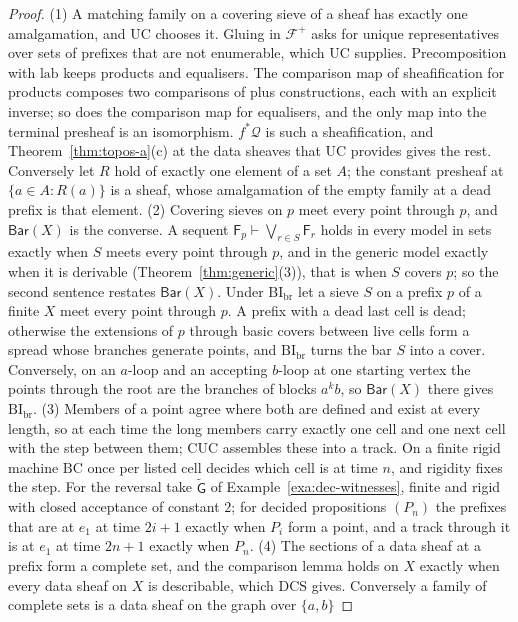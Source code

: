 \documentclass{lmcs}
\theoremstyle{definition}
\theoremstyle{remark}
\newcommand{\ab}{\{a,b\}}
\newcommand{\prin}[1]{\mathrm{#1}}
\newcommand{\UC}{\prin{UC}}
\newcommand{\Der}{\vdash}
\newcommand{\fat}[1]{\mathsf{F}_{#1}}
\newcommand{\lab}{\mathrm{lab}}
\newcommand{\BarS}[1]{\mathsf{Bar}(#1)}
\providecommand{\CUC}{\prin{CUC}}
\providecommand{\BC}{\prin{BC}}
\providecommand{\lab}{\mathrm{lab}}
\providecommand{\fin}{f^{\ast}}
\providecommand{\BIb}{\prin{BI}_{\mathrm{br}}}
\providecommand{\DCS}{\prin{DCS}}
\providecommand{\CUC}{\prin{CUC}}
\providecommand{\BC}{\prin{BC}}
\providecommand{\wGt}{\tilde{\mathsf{G}}}
\begin{document}
\begin{proof}
(1) A matching family on a covering sieve of a sheaf has exactly one amalgamation, and $\UC$ chooses
it. Gluing in $\mathscr{F}^+$ asks for unique representatives over sets of prefixes that
are not enumerable, which $\UC$
supplies.
Precomposition with $\lab$ keeps products and equalisers. The comparison map of sheafification for products
composes two comparisons of plus constructions, each with an explicit inverse;
so does the comparison map for equalisers, and the only map into the terminal presheaf is an
isomorphism.
$\fin\mathscr{Q}$ is such a sheafification, and Theorem~\ref{thm:topos-a}(c) at the data sheaves that $\UC$ provides
gives the rest. Conversely let $R$ hold of exactly one element of a set $A$; the constant presheaf at $\{a\in A : R(a)\}$ is a
sheaf, whose amalgamation of the empty family at a dead prefix is that element.
(2) Covering sieves on $p$ meet every point through $p$, and $\BarS{X}$ is the
converse. A sequent $\fat{p}\Der\bigvee_{r\in S}\fat{r}$
holds in every model in sets exactly when $S$ meets every point through $p$, and in the generic model exactly when it
is derivable (Theorem~\ref{thm:generic}(3)), that is when $S$ covers
$p$;
so the second sentence restates $\BarS{X}$. Under $\BIb$ let a sieve $S$ on a
prefix $p$ of a finite $X$ meet every point through $p$. A prefix with a dead last cell is dead; otherwise the
extensions of $p$ through basic covers between live cells form a spread \cite{TvD88} whose branches generate points, and $\BIb$
turns the bar $S$ into a
cover.
Conversely, on an $a$-loop and an accepting $b$-loop at one starting vertex the points through the root are the
branches of blocks $a^kb$, so $\BarS{X}$ there gives $\BIb$.
(3) Members of a point agree where both are defined and exist at every
length, so at each time the long members carry exactly one
cell and one next cell with the step between them; $\CUC$ assembles these into a
track. On a finite rigid machine $\BC$ once per listed cell decides which cell
is at time $n$, and rigidity fixes the step.
For the reversal take $\wGt$ of Example~\ref{exa:dec-witnesses}, finite and rigid with closed acceptance of
constant $2$; for decided propositions
$(P_n)$ the prefixes that are at $e_1$ at time $2i+1$ exactly when $P_i$ form a
point, and a track
through it is at $e_1$ at time $2n+1$ exactly when $P_n$.
(4) The sections of a data sheaf at a prefix form a complete set, and the comparison lemma holds
on $X$ exactly when every data sheaf on $X$ is describable, which $\DCS$
gives. Conversely a family of complete sets is a data sheaf on the graph over $\ab$

\end{proof}
\end{document}
